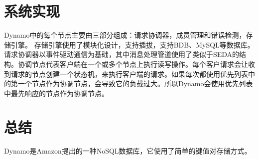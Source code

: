 \documentclass[UTF8]{article}
\begin{document}
\section{系统实现}
	Dynamo中的每个节点主要由三部分组成：请求协调器，成员管理和错误检测，存储引擎。
	存储引擎使用了模块化设计，支持插拔，支持BDB、MySQL等数据库。
	请求协调器以事件驱动通信为基础，其中消息处理管道使用了类似于SEDA的结构。协调节点代表客户端在一个或多个节点上执行读写操作。每个客户请求会让收到请求的节点创建一个状态机，来执行客户端的请求。如果每次都使用优先列表中的第一个节点作为协调节点，会导致它的负载过大。所以Dynamo会使用优先列表中最先响应的节点作为协调节点。

\section{总结}
	Dynamo是Amazon提出的一种NoSQL数据库，它使用了简单的键值对存储方式。



\end{document}
